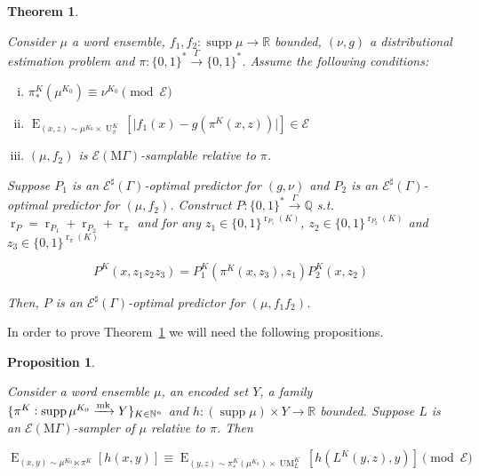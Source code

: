 \documentclass{article}
\numberwithin{equation}{section}
\theoremstyle{definition}
\theoremstyle{plain}
\newtheorem{theorem}{Theorem}[section]
\newtheorem{proposition}{Proposition}[section]
\newcommand{\Bool}{\{0,1\}}
\newcommand{\Words}{{\Bool^*}}
\newcommand{\WordsLen}[1]{{\Bool^{#1}}}
\DeclareMathOperator{\Supp}{supp}
\DeclareMathOperator{\E}{E}
\DeclareMathOperator{\R}{r}
\DeclareMathOperator{\UM}{UM}
\DeclareMathOperator{\Un}{U}
\newcommand{\Nats}{\mathbb{N}}
\newcommand{\Rats}{\mathbb{Q}}
\newcommand{\Reals}{\mathbb{R}}
\newcommand{\Abs}[1]{\lvert #1 \rvert}
\newcommand{\MGrow}{\mathrm{M}\Gamma}
\newcommand{\Fall}{\mathcal{E}}
\newcommand{\ESG}{\Fall^\sharp(\Gamma)}
\newcommand{\EMG}{\Fall(\MGrow)}
\newcommand{\Markov}{\xrightarrow{\textnormal{mk}}}
\newcommand{\Scheme}{\xrightarrow{\Gamma}}
\begin{document}
\begin{samepage}
\begin{theorem}
\label{thm:mult}

Consider $\mu$ a word ensemble, $f_1, f_2: \Supp \mu \rightarrow \Reals$ bounded, $(\nu,g)$ a distributional estimation problem and $\pi: \Words \Scheme \Words$. Assume the following conditions:

\begin{enumerate}[(i)]

\item $\pi_*^{K}(\mu^{K_0}) \equiv \nu^{K_0} \pmod \Fall$

\item $\E_{(x,z) \sim \mu^{K_0} \times \Un_\pi^{K}}[\Abs{f_1(x)-g(\pi^{K}(x,z))}] \in \Fall$

\item $(\mu, f_2)$ is $\EMG$-samplable relative to $\pi$.

\end{enumerate}

Suppose $P_1$ is an $\ESG$-optimal predictor for $(g,\nu)$ and $P_2$ is an $\ESG$-optimal predictor for $(\mu,f_2)$. Construct $P: \Words \Scheme \Rats$ s.t. $\R_P=\R_{P_1}+\R_{P_2}+\R_{\pi}$ and for any $z_1 \in \WordsLen{\R_{P_1}(K)}$, $z_2 \in \WordsLen{\R_{P_2}(K)}$ and $z_3 \in \WordsLen{\R_\pi(K)}$

\begin{equation}
P^{K}(x,z_1 z_2 z_3)=P_1^{K}(\pi^{K}(x,z_3),z_1) P_2^{K}(x,z_2)
\end{equation}

Then, $P$ is an $\ESG$-optimal predictor for $(\mu,f_1 f_2)$.

\end{theorem}
\end{samepage}

In order to prove Theorem~\ref{thm:mult} we will need the following propositions.

\begin{samepage}
\begin{proposition}
\label{prp:smp}

Consider a word ensemble $\mu$, an encoded set $Y$, a family $\{\pi^K: \Supp \mu^{K_0} \Markov Y\}_{K \in \Nats^n}$ and ${h: (\Supp \mu) \times Y \rightarrow \Reals}$ bounded. Suppose $L$ is an $\EMG$-sampler of $\mu$ relative to $\pi$. Then

\begin{equation}
\E_{(x,y) \sim \mu^{K_0} \ltimes \pi^K}[h(x,y)] \equiv \E_{(y,z) \sim \pi_*^K(\mu^{K_0}) \times \UM_L^K}[h(L^K(y,z),y)] \pmod \Fall
\end{equation}

\end{proposition}
\end{samepage}
\end{document}
